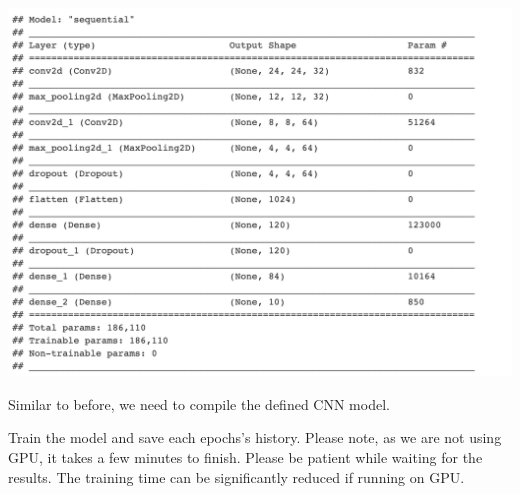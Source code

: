 \documentclass[12pt,]{krantz}
\makeatletter
\newenvironment{Shaded}{\begin{snugshade}}{\end{snugshade}}
\newcommand{\DataTypeTok}[1]{\textcolor[rgb]{0.27,0.27,0.27}{#1}}
\newcommand{\FloatTok}[1]{\textcolor[rgb]{0.06,0.06,0.06}{#1}}
\newcommand{\KeywordTok}[1]{\textcolor[rgb]{0.27,0.27,0.27}{\textbf{#1}}}
\newcommand{\NormalTok}[1]{#1}
\newcommand{\OperatorTok}[1]{\textcolor[rgb]{0.43,0.43,0.43}{\textbf{#1}}}
\newcommand{\StringTok}[1]{\textcolor[rgb]{0.5,0.5,0.5}{#1}}
\newenvironment{kframe}{%
\medskip{}
\setlength{\fboxsep}{.8em}
 \def\at@end@of@kframe{}%
 \ifinner\ifhmode%
  \def\at@end@of@kframe{\end{minipage}}%
  \begin{minipage}{\columnwidth}%
 \fi\fi%
 \def\FrameCommand##1{\hskip\@totalleftmargin \hskip-\fboxsep
 \colorbox{shadecolor}{##1}\hskip-\fboxsep
     \hskip-\linewidth \hskip-\@totalleftmargin \hskip\columnwidth}%
 \MakeFramed {\advance\hsize-\width
   \@totalleftmargin\z@ \linewidth\hsize
   \@setminipage}}%
 {\par\unskip\endMakeFramed%
 \at@end@of@kframe}
\renewenvironment{Shaded}{\begin{kframe}}{\end{kframe}}
\makeatother
\begin{document}
\includegraphics[width=1\textwidth,height=\textheight]{images/cnn_summary.png}

Similar to before, we need to compile the defined CNN model.

\begin{Shaded}
\end{Shaded}

Train the model and save each epochs's history. Please note, as we are not using GPU, it takes a few minutes to finish. Please be patient while waiting for the results. The training time can be significantly reduced if running on GPU.

\begin{Shaded}
\end{Shaded}
\end{document}
